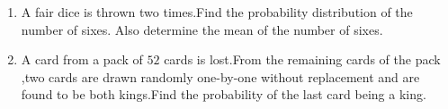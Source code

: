 \begin{enumerate}
\item A fair dice is thrown two times.Find the probability distribution of the number of sixes. Also determine the mean of the number of sixes.
\item A card from a pack of $52$ cards is lost.From the remaining cards of the pack ,two cards are drawn randomly one-by-one without replacement and are found to be both kings.Find the probability of the last card being a king.
\end{enumerate}
